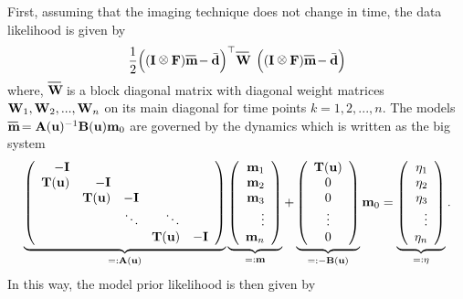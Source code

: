 \documentclass[12pt]{article}
\newcommand {\bu}   { {\bf u} }   	%
\newcommand {\bfd}   { {\bf d} }
\newcommand {\bfm}   { {\bf m} }
\newcommand{\hf}		 {\frac12}
\newcommand{\bA}  { {\bf A} }      %
\newcommand{\bB}  { {\bf B} }      %
\newcommand{\bI}  { {\bf I} }      %
\newcommand{\bF}  { {\bf F} }      %
\newcommand{\bT}  {\text{\bf T}} %
\newcommand{\bfW}  {\text{{\bf W}}} %
\newcommand*\xbar[1]{%
  \hbox{%
    \vbox{%
      \hrule height 0.5pt %
      \kern0.5ex%
      \hbox{%
        \kern-0.em%
        \ensuremath{#1}%
        \kern-0.15em%
      }%
    }%
  }%
}
\newcommand{\mbar}{\xbar{\bf m}}
\def\kronecker{\raisebox{1pt}{\ensuremath{\:\otimes\:}}}
\begin{document}
First, assuming that the imaging technique does not change in time, the data likelihood is given by
\begin{equation}
\hf \Big((\bI \kronecker \bF) \mbar- \bar{\bfd} \Big)^{\top} \xbar{\bfW} \;\; \Big((\bI \kronecker \bF)  \mbar -\bar{\bfd} \Big)
\end{equation}
where, $\xbar{\bfW}$ is a block diagonal matrix with diagonal weight matrices $\bfW_1,\bfW_2,...,\bfW_n$ on its main diagonal for  time points $ k = 1,2,...,n$. The  models $\mbar = \bA(\bu)^{-1} \bB(\bu) \bfm_0 $ are governed by the dynamics which  is  written as the big system
\begin{equation}\label{eq:FlowSystem}
	 \underbrace{
		\left( 
			\begin{array}{rrrrr}
				- \bI      &           &         &        &        \\
				  \bT( \bu) & -\bI      &         &        &        \\
				           &  \bT( \bu) & -\bI    &        &        \\
				           &           &  \ddots & \ddots &        \\
				           &           &         & \bT(\bu)    & -\bI   \\
			\end{array}
		\right)
	 }_{=: \bA(\bu)}
	 \underbrace{
		\left(
			\begin{array}{r}
				\bfm_1 \\ \bfm_2 \\ \bfm_3 \\ \vdots \\ \bfm_n
			\end{array}
		\right)
	 }_{=: \bfm}
	+
	 \underbrace{
		\left(
			\begin{array}{c}
			\bT(\bu) \\ 0  \\ 0\\ \vdots \\ 0
			\end{array}
		\right)
	 }_{=: -\bB(\bu)}
	\bfm_0
	= 
	\underbrace{
		\left(
			\begin{array}{r}
				\eta_1 \\ \eta_2 \\ \eta_3 \\ \vdots \\ \eta_n
			\end{array}
		\right)
	 }_{=: {\bf \eta}}.
\end{equation}
In this way, the model prior likelihood is then given by
\end{document}
